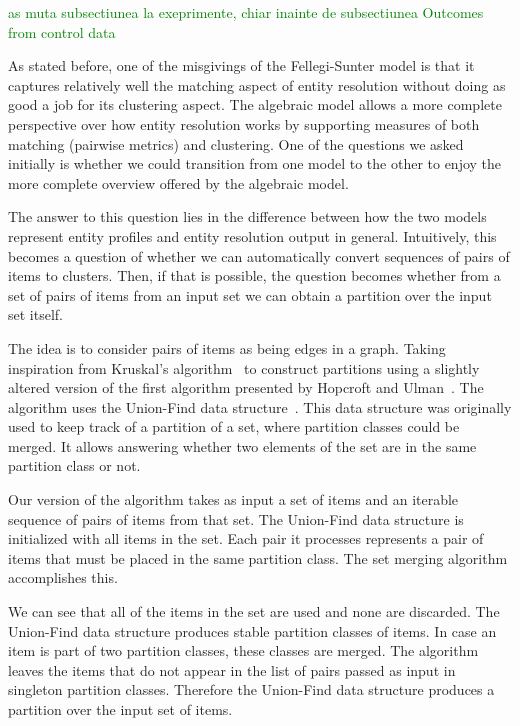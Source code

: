 
\textcolor{green}{as muta subsectiunea la exeprimente, chiar inainte de subsectiunea Outcomes from control data}
    
As stated before, one of the misgivings of the Fellegi-Sunter model is that
it captures relatively well the matching aspect of entity resolution without
doing as good a job for its clustering aspect.
The algebraic model allows a more complete perspective over how entity
resolution works by supporting measures of both matching (pairwise metrics)
and clustering.
One of the questions we asked initially is whether we could transition from
one model to the other to enjoy the more complete overview offered by the
algebraic model.

The answer to this question lies in the difference between how the two
models represent entity profiles and entity resolution output in general.
Intuitively, this becomes a question of whether we can automatically convert
sequences of pairs of items to clusters.
Then, if that is possible, the question becomes whether from a set of pairs
of items from an input set we can obtain a partition over the input set
itself.

The idea is to consider pairs of items as being edges in a graph.
Taking inspiration from Kruskal's algorithm~\cite{kruskal1956} to construct
partitions using a slightly altered version of the first algorithm presented by
Hopcroft and Ulman~\cite{hopcroft1973set}.
The algorithm uses the Union-Find data structure~\cite{unionfind1964}.
This data structure was originally used to keep track of a partition of a set,
where partition classes could be merged.
It allows answering whether two elements of the set are in the same partition
class or not.

Our version of the algorithm takes as input a set of items and an iterable
sequence of pairs of items from that set.
The Union-Find data structure is initialized with all items in the set.
Each pair it processes represents a pair of items that must be placed in the
same partition class.
The set merging algorithm accomplishes this.

We can see that all of the items in the set are used and none are discarded.
The Union-Find data structure produces stable partition classes of items.
In case an item is part of two partition classes, these classes are merged.
The algorithm leaves the items that do not appear in the list of pairs passed as
input in singleton partition classes.
Therefore the Union-Find data structure produces a partition over the input
set of items.

